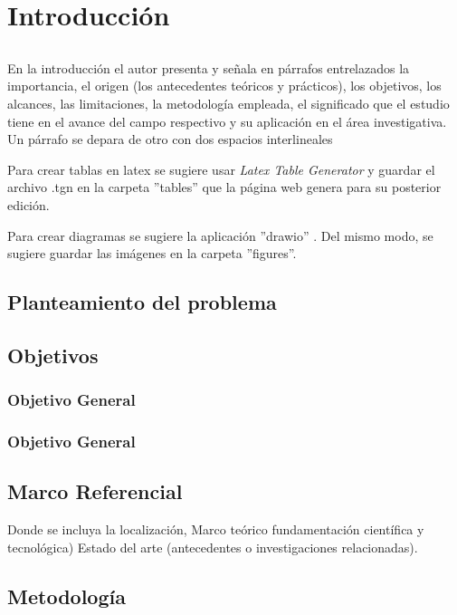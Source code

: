 %
\chapter{Introducción}
\label{ch::introduction}

\section*{}
\label{sec:context}

En la introducción el autor presenta y señala en párrafos entrelazados la importancia, el origen (los antecedentes teóricos y prácticos), los objetivos, los alcances, las limitaciones, la metodología empleada, el significado que el estudio tiene en el avance del campo respectivo y su aplicación en el área investigativa. Un párrafo se depara de otro con dos espacios interlineales \parencite{american2022manual}

Para crear tablas en latex se sugiere usar \textit{Latex Table Generator} \parencite{CreateLa18:online} y guardar el archivo .tgn en la carpeta ''tables'' que la página web genera para su posterior edición. 

Para crear diagramas se sugiere la aplicación ''drawio'' \parencite{drawio20:online}. Del mismo modo, se sugiere guardar las imágenes en la carpeta ''figures''.

\section{Planteamiento del problema}
\label{sec:problem}

\section{Objetivos}
\label{sec:objectives}

\subsection{Objetivo General}
\label{subsec:obj_general}

\subsection{Objetivo General}
\label{subsec:obj_specific}

\section{Marco Referencial}
\label{sec:state_art}

Donde se incluya la localización, Marco teórico fundamentación científica y tecnológica) Estado del arte (antecedentes o investigaciones relacionadas). 

\section{Metodología}
\label{sec:method}